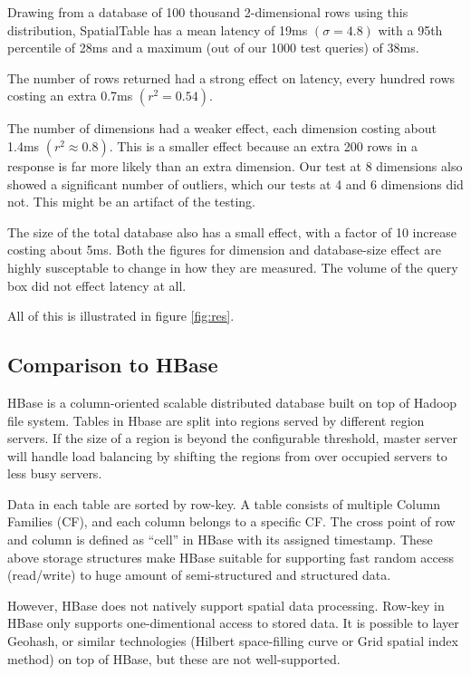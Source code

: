 \documentclass[11pt]{article}
\begin{document}
Drawing from a database of 100 thousand 2-dimensional rows using this distribution, SpatialTable has a mean latency of 19ms $(\sigma=4.8)$ with a 95th percentile of 28ms and a maximum (out of our 1000 test queries) of 38ms.

The number of rows returned had a strong effect on latency, every hundred rows costing an extra 0.7ms $(r^2=0.54)$.

The number of dimensions had a weaker effect, each dimension costing about 1.4ms $(r^2\approx 0.8)$.  This is a smaller effect because an extra 200 rows in a response is far more likely than an extra dimension.  Our test at 8 dimensions also showed a significant number of outliers, which our tests at 4 and 6 dimensions did not.   This might be an artifact of the testing.

The size of the total database also has a small effect, with a factor of 10 increase costing about 5ms.  Both the figures for dimension and database-size effect are highly susceptable to change in how they are measured.  The volume of the query box did not effect latency at all.

All of this is illustrated in figure \ref{fig:res}.

\subsection{Comparison to HBase}

HBase is a column-oriented scalable distributed database built on top of Hadoop file system. Tables in Hbase are split into regions served by different region servers. If the size of a region is beyond the configurable threshold, master server will handle load balancing by shifting the regions from over occupied servers to less busy servers. 

Data in each table are sorted by row-key. A table consists of multiple Column Families (CF), and each column belongs to a specific CF. The cross point of row and column is defined as ``cell''  in HBase with its assigned timestamp. These above storage structures make HBase suitable for supporting fast random access (read/write) to huge amount of semi-structured and structured data. 

However, HBase does not natively support spatial data processing. Row-key in HBase only supports one-dimentional access to stored data. It is possible to layer Geohash,\cite{geohash} or similar technologies (Hilbert space-filling curve\cite{hilbert} or Grid spatial index method\cite{grid}) on top of HBase, but these are not well-supported.
\end{document}
